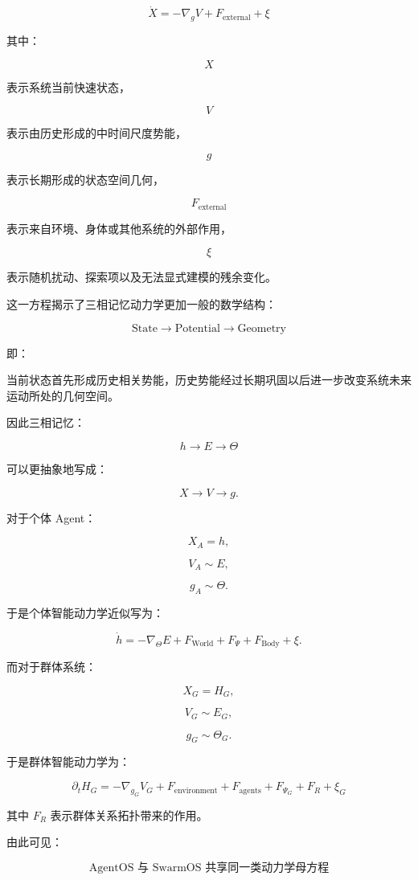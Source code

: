 \[
\boxed{
\dot X
=
-\nabla_g V
+
F_{\mathrm{external}}
+
\xi
}
\]

其中：

\[
X
\]

表示系统当前快速状态，

\[
V
\]

表示由历史形成的中时间尺度势能，

\[
g
\]

表示长期形成的状态空间几何，

\[
F_{\mathrm{external}}
\]

表示来自环境、身体或其他系统的外部作用，

\[
\xi
\]

表示随机扰动、探索项以及无法显式建模的残余变化。

这一方程揭示了三相记忆动力学更加一般的数学结构：

\[
\boxed{
\text{State}
\rightarrow
\text{Potential}
\rightarrow
\text{Geometry}
}
\]

即：

当前状态首先形成历史相关势能，历史势能经过长期巩固以后进一步改变系统未来运动所处的几何空间。

因此三相记忆：

\[
h
\rightarrow
E
\rightarrow
\Theta
\]

可以更抽象地写成：

\[
X
\rightarrow
V
\rightarrow
g.
\]

对于个体 Agent：

\[
X_A = h,
\]

\[
V_A \sim E,
\]

\[
g_A \sim \Theta.
\]

于是个体智能动力学近似写为：

\[
\dot h
=
-\nabla_{\Theta}E
+
F_{\mathrm{World}}
+
F_{\Psi}
+
F_{\mathrm{Body}}
+
\xi.
\]

而对于群体系统：

\[
X_G = H_G,
\]

\[
V_G \sim E_G,
\]

\[
g_G \sim \Theta_G.
\]

于是群体智能动力学为：

\[
\boxed{
\partial_t H_G
=
-\nabla_{g_G}V_G
+
F_{\mathrm{environment}}
+
F_{\mathrm{agents}}
+
F_{\Psi_G}
+
F_R
+
\xi_G
}
\]

其中 $F_R$ 表示群体关系拓扑带来的作用。

由此可见：

\[
\boxed{
\text{AgentOS 与 SwarmOS 共享同一类动力学母方程}
}
\]

